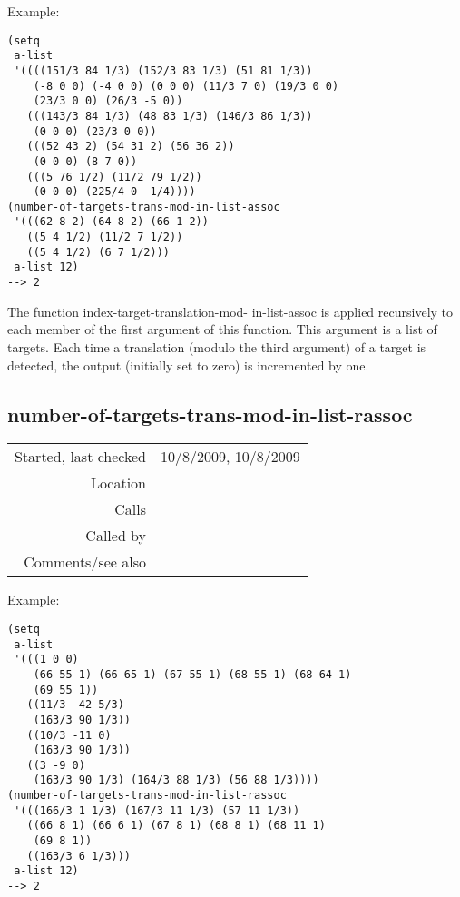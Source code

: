 \vspace{0.5cm}
\noindent Example:
\begin{verbatim}
(setq
 a-list
 '((((151/3 84 1/3) (152/3 83 1/3) (51 81 1/3))
    (-8 0 0) (-4 0 0) (0 0 0) (11/3 7 0) (19/3 0 0) 
    (23/3 0 0) (26/3 -5 0))
   (((143/3 84 1/3) (48 83 1/3) (146/3 86 1/3))
    (0 0 0) (23/3 0 0))
   (((52 43 2) (54 31 2) (56 36 2))
    (0 0 0) (8 7 0))
   (((5 76 1/2) (11/2 79 1/2))
    (0 0 0) (225/4 0 -1/4))))
(number-of-targets-trans-mod-in-list-assoc
 '(((62 8 2) (64 8 2) (66 1 2))
   ((5 4 1/2) (11/2 7 1/2))
   ((5 4 1/2) (6 7 1/2)))
 a-list 12)
--> 2
\end{verbatim}

\noindent The function index-target-translation-mod-
in-list-assoc is applied recursively to each member of
the first argument of this function. This argument is
a list of targets. Each time a translation (modulo the
third argument) of a target is detected, the output
(initially set to zero) is incremented by one.


\subsection*{number-of-targets-trans-mod-in-list-rassoc}\label{fun:number-of-targets-trans-mod-in-list-rassoc}

\vspace{0.3cm}
\begin{tabular}{r|p{8cm}}
Started, last checked & 10/8/2009, 10/8/2009 \\
Location & \nameref{sec:evaluation-for-SIA+} \\
Calls & \nameref{fun:index-target-translation-mod-in-list-rassoc} \\
Called by & \\
Comments/see also &
\end{tabular}

\vspace{0.5cm}
\noindent Example:
\begin{verbatim}
(setq
 a-list
 '(((1 0 0)
    (66 55 1) (66 65 1) (67 55 1) (68 55 1) (68 64 1)
    (69 55 1))
   ((11/3 -42 5/3)
    (163/3 90 1/3))
   ((10/3 -11 0)
    (163/3 90 1/3))
   ((3 -9 0)
    (163/3 90 1/3) (164/3 88 1/3) (56 88 1/3))))
(number-of-targets-trans-mod-in-list-rassoc
 '(((166/3 1 1/3) (167/3 11 1/3) (57 11 1/3))
   ((66 8 1) (66 6 1) (67 8 1) (68 8 1) (68 11 1)
    (69 8 1))
   ((163/3 6 1/3)))
 a-list 12)
--> 2
\end{verbatim}

